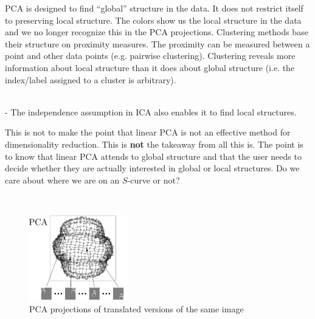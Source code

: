 PCA is designed to find ``global'' structure in the data. It does not restrict itself to preserving local structure. The colors show us the local structure in the data and we no longer recognize this in the PCA projections. Clustering methods base their structure on proximity measures. The proximity can be measured between a point and other data points (e.g. pairwise clustering). Clustering reveals more information about local structure than it does about global structure (i.e. the index/label assigned to a cluster is arbitrary).

\\

- The independence assumption in ICA also enables it to find local structures.

This is not to make the point that linear PCA is not an effective method for dimensionality reduction. This is \textbf{not} the takeaway from all this is. The point is to know that linear PCA attends to global structure and that the user needs to decide whether they are actually interested in global or local structures. Do we care about where we are on an $S$-curve or not?


\begin{frame}
\\


\begin{figure}[ht]
	\centering
	\includegraphics[width=4.3cm]{img/fig3_lle_intro_cropped_pca.png}
	\caption{PCA projections of translated versions of the same image}
	\label{fig:faces_translated_pca}
\end{figure}


\end{frame}


